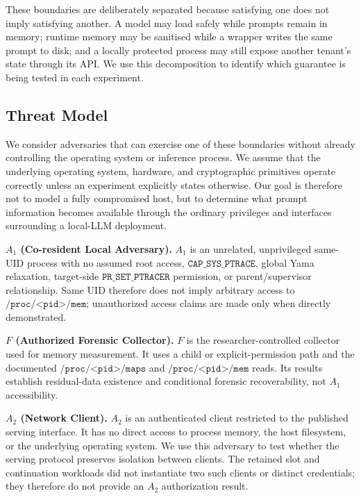 \documentclass[journal,tifs]{IEEEtran}
\begin{document}
These boundaries are deliberately separated because satisfying one does
not imply satisfying another. A model may load safely while prompts
remain in memory; runtime memory may be sanitised while a wrapper writes
the same prompt to disk; and a locally protected process may still expose
another tenant's state through its API. We use this decomposition to
identify which guarantee is being tested in each experiment.

\subsection{Threat Model}
\label{sec:threat}

We consider adversaries that can exercise one of these boundaries without
already controlling the operating system or inference process. We assume
that the underlying operating system, hardware, and cryptographic
primitives operate correctly unless an experiment explicitly states
otherwise. Our goal is therefore not to model a fully compromised host,
but to determine what prompt information becomes available through the
ordinary privileges and interfaces surrounding a local-LLM deployment.

\noindent\textbf{${A}_1$ (Co-resident Local Adversary).}
${A}_1$ is an unrelated, unprivileged same-UID process with no assumed
root access, $\texttt{CAP\_SYS\_PTRACE}$, global Yama relaxation,
target-side $\texttt{PR\_SET\_PTRACER}$ permission, or parent/supervisor
relationship. Same UID therefore does not imply arbitrary access to
$\texttt{/proc/<pid>/mem}$; unauthorized access claims are made only when
directly demonstrated.

\noindent\textbf{$F$ (Authorized Forensic Collector).}
$F$ is the researcher-controlled collector used for memory measurement. It
uses a child or explicit-permission path and the documented
$\texttt{/proc/<pid>/maps}$ and $\texttt{/proc/<pid>/mem}$ reads. Its results
establish residual-data existence and conditional forensic recoverability,
not ${A}_1$ accessibility.

\noindent\textbf{${A}_2$ (Network Client).}
${A}_2$ is an authenticated client restricted to the published serving
interface. It has no direct access to process memory, the host filesystem,
or the underlying operating system. We use this adversary to test whether
the serving protocol preserves isolation between clients. The retained slot
and continuation workloads did not instantiate two such clients or distinct
credentials; they therefore do not provide an $A_2$ authorization result.
\end{document}

